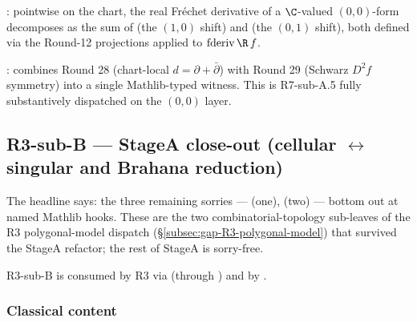\begin{lemma}[Round 28: \(d = \partial + \bar\partial\) on \((0,0)\)-forms]
\label{lem:r7subA-r28}
: pointwise on the chart, the
real Fr\'echet derivative of a \(\C\)-valued \((0,0)\)-form
decomposes as the sum of  (the \((1,0)\)
shift) and  (the \((0,1)\) shift), both
defined via the Round-12 projections applied to
\(\mathrm{fderiv}\,\R\,f\).
\leanok
\end{lemma}

\begin{lemma}
\label{lem:r7subA-r30}
: combines Round 28
(chart-local \(d = \partial + \bar\partial\)) with Round 29
(Schwarz \(D^{2}f\) symmetry) into a single Mathlib-typed
witness.  This is R7-sub-A.5 fully substantively dispatched on
the \((0,0)\) layer.
\leanok
\end{lemma}

\subsection{R3-sub-B --- StageA close-out (cellular \(\leftrightarrow\) singular and Brahana reduction)}
\label{subsec:gap-R3subB-stageA-closeout}

The headline says: the three remaining  sorries
---  (one),  (two)
--- bottom out at named Mathlib hooks.  These are the two combinatorial-topology
sub-leaves of the R3 polygonal-model dispatch
(\S\ref{subsec:gap-R3-polygonal-model}) that survived the StageA
refactor; the rest of StageA is sorry-free.

R3-sub-B is consumed by R3 via
(through ) and by
.

\subsubsection*{Classical content}

